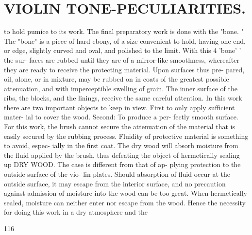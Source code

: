 \documentclass{article}
\begin{document}
\section*{VIOLIN TONE-PECULIARITIES.}
to hold pumice to its work. The final preparatory work is done with the "bone. " The "bone" is a piece of hard ebony, of a size convenient to hold, having one end, or edge, slightly curved and oval, and polished to the limit. With this 4 'bone' ' the sur- faces are rubbed until they are of a mirror-like smoothness, whereafter they are ready to receive the protecting material. Upon surfaces thus pre- pared, oil, alone, or in mixture, may be rubbed on in coats of the greatest possible attenuation, and with imperceptible swelling of grain. The inner surface of the ribs, the blocks, and the linings, receive the same careful attention. In this work there are two important objects to keep in view. First to only apply sufficient mater- ial to cover the wood. Second: To produce a per- fectly smooth surface. For this work, the brush cannot secure the attenuation of the material that is easily secured by the rubbing process. Fluidity of protective material is something to avoid, espec- ially in the first coat. The dry wood will absorb moisture from the fluid applied by the brush, thus defeating the object of hermetically sealing up DRY WOOD. The case is different from that of ap- plying protection to the outside surface of the vio- lin plates. Should absorption of fluid occur at the outside surface, it may escape from the interior surface, and no precaution against admission of moisture into the wood can be too great. When hermetically sealed, moisture can neither enter nor escape from the wood. Hence the necessity for doing this work in a dry atmosphere and the

116
\end{document}
